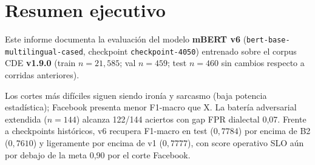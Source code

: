 \chapter*{Resumen ejecutivo}

Este informe documenta la evaluación del modelo \textbf{mBERT v6}
(\texttt{bert-base-multilingual-cased}, checkpoint \texttt{checkpoint-4050})
entrenado sobre el corpus CDE \textbf{v1.9.0} (train $n=21{,}585$; val $n=459$;
test $n=460$ sin cambios respecto a corridas anteriores).



\begin{table}[H]
\centering
\caption{Métricas globales oficiales (test, $n=460$).}
\label{tab:resumen-global}

\end{table}

Los cortes más difíciles siguen siendo ironía y sarcasmo (baja potencia
estadística); Facebook presenta menor F1-macro que X. La batería adversarial
extendida ($n=144$) alcanza 122/144 aciertos con gap FPR dialectal 0{,}07.
Frente a checkpoints históricos, v6 recupera F1-macro en test
($0{,}7784$) por encima de B2 ($0{,}7610$) y ligeramente por encima de v1
($0{,}7777$), con score operativo SLO aún por debajo de la meta 0{,}90 por el
corte Facebook.

\clearpage
